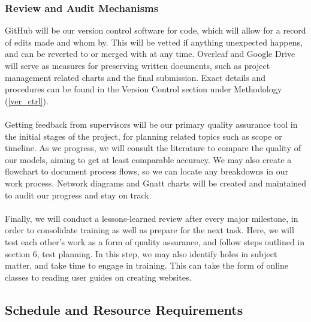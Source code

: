 \documentclass[a4paper, 12pt]{article}
\begin{document}
        \subsubsection{Review and Audit Mechanisms}
        GitHub will be our version control software for code, which will allow for a record of edits made and whom by. This will be vetted if anything unexpected happens, and can be reverted to or merged with at any time. Overleaf and Google Drive will serve as measures for preserving written documents, such as project management related charts and the final submission. Exact details and procedures can be found in the Version Control section under Methodology (\ref{ver_ctrl}).
        \\\\
        Getting feedback from supervisors will be our primary quality assurance tool in the initial stages of the project, for planning related topics such as scope or timeline. As we progress, we will consult the literature to compare the quality of our models, aiming to get at least comparable accuracy.
        We may also create a flowchart to document process flows, so we can locate any breakdowns in our work process. Network diagrams and Gnatt charts will be created and maintained to audit our progress and stay on track.
        \\\\
        Finally, we will conduct a lessons-learned review after every major milestone, in order to consolidate training as well as prepare for the next task. Here, we will test each other's work as a form of quality assurance, and follow steps outlined in section 6, test planning. In this step, we may also identify holes in subject matter, and take time to engage in training. This can take the form of online classes to reading user guides on creating websites.

    \subsection{Schedule and Resource Requirements}
\end{document}
